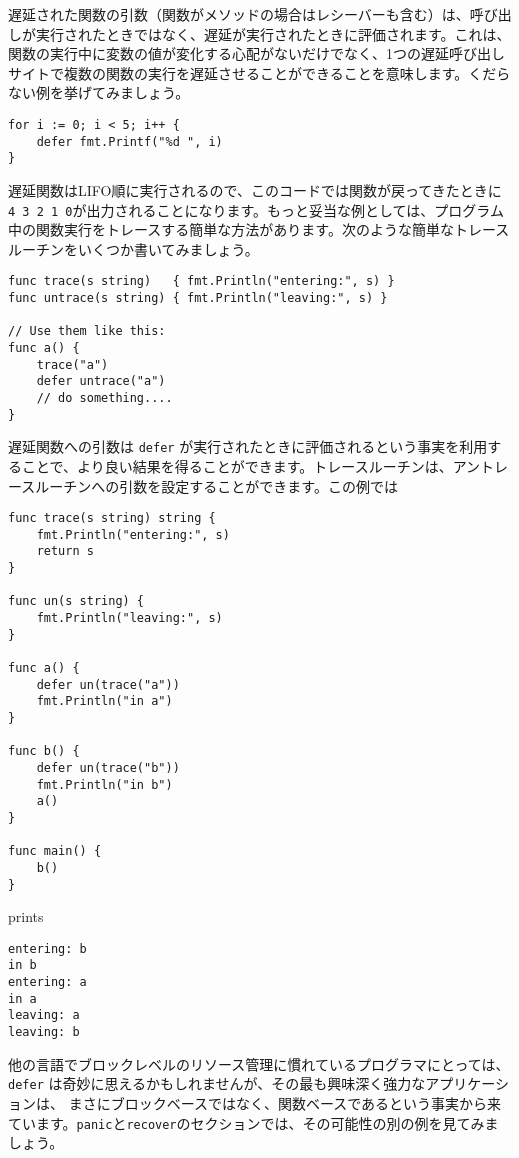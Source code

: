 \documentclass{jsarticle}
\begin{document}
遅延された関数の引数（関数がメソッドの場合はレシーバーも含む）は、呼び出しが実行されたときではなく、遅延が実行されたときに評価されます。これは、関数の実行中に変数の値が変化する心配がないだけでなく、1つの遅延呼び出しサイトで複数の関数の実行を遅延させることができることを意味します。くだらない例を挙げてみましょう。

\begin{lstlisting}[numbers=none]
for i := 0; i < 5; i++ {
    defer fmt.Printf("%d ", i)
}
\end{lstlisting}

遅延関数はLIFO順に実行されるので、このコードでは関数が戻ってきたときに\texttt{4\ 3\ 2\ 1\ 0}が出力されることになります。もっと妥当な例としては、プログラム中の関数実行をトレースする簡単な方法があります。次のような簡単なトレースルーチンをいくつか書いてみましょう。

\begin{lstlisting}[numbers=none]
func trace(s string)   { fmt.Println("entering:", s) }
func untrace(s string) { fmt.Println("leaving:", s) }

// Use them like this:
func a() {
    trace("a")
    defer untrace("a")
    // do something....
}
\end{lstlisting}

遅延関数への引数は \texttt{defer}
が実行されたときに評価されるという事実を利用することで、より良い結果を得ることができます。トレースルーチンは、アントレースルーチンへの引数を設定することができます。この例では

\begin{lstlisting}[numbers=none]
func trace(s string) string {
    fmt.Println("entering:", s)
    return s
}

func un(s string) {
    fmt.Println("leaving:", s)
}

func a() {
    defer un(trace("a"))
    fmt.Println("in a")
}

func b() {
    defer un(trace("b"))
    fmt.Println("in b")
    a()
}

func main() {
    b()
}

\end{lstlisting}

prints

\begin{lstlisting}[numbers=none]
entering: b
in b
entering: a
in a
leaving: a
leaving: b
\end{lstlisting}

他の言語でブロックレベルのリソース管理に慣れているプログラマにとっては、
\texttt{defer}
は奇妙に思えるかもしれませんが、その最も興味深く強力なアプリケーションは、
まさにブロックベースではなく、関数ベースであるという事実から来ています。\texttt{panic}と\texttt{recover}のセクションでは、その可能性の別の例を見てみましょう。
\end{document}
